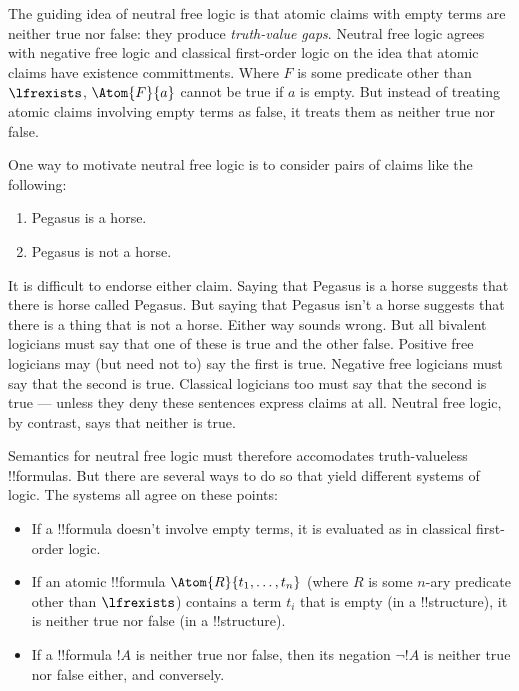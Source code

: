 \documentclass[../../../include/open-logic-section]{subfiles}
\begin{document}


The guiding idea of neutral free logic is that atomic claims with empty
terms are neither true nor false: they produce \emph{truth-value gaps}. 
Neutral free logic agrees with negative free logic and classical first-order
logic on the idea that atomic claims have existence committments. Where $F$ 
is some predicate other than $\lfrexists$, $\Atom{F}{a}$ cannot be 
true if $a$ is empty. But instead of treating atomic
claims involving empty terms as false, it treats them as neither true nor 
false. 

\begin{explain}
One way to motivate neutral free logic is to consider pairs of claims like
the following: 

\begin{enumerate}
  \item Pegasus is a horse.
  \item Pegasus is not a horse. 
\end{enumerate}

It is difficult to endorse either claim. Saying that Pegasus is a horse 
suggests that there is horse called Pegasus. But saying that Pegasus isn't
a horse suggests that there is a thing that is not a horse. Either way sounds
wrong. But all bivalent logicians must say that one of these is true and
the other false. Positive free logicians may (but need not to) say the first is true. 
Negative free logicians must say that the second is true. Classical logicians 
too must say that the second is true --- unless they deny these sentences express
claims at all. Neutral free logic, by contrast, says that neither is true.
\end{explain}

Semantics for neutral free logic must therefore accomodates truth-valueless
!!{formula}s. But there are several ways to do so that yield different 
systems of logic. The systems all agree on these points:

\begin{itemize}
	\item If a !!{formula} doesn't involve empty terms, it is evaluated
	as in classical first-order logic. 
	\item If an atomic !!{formula} $\Atom{R}{t_1,\ldots,t_n}$ (where $R$
	is some $n$-ary predicate other than $\lfrexists$) contains a
	term $t_i$ that is empty (in a !!{structure}), it is neither true nor 
	false (in a !!{structure}).
	\item If a !!{formula} $!A$ is neither true nor false, then its negation
	$\lnot !A$ is neither true nor false either, and conversely. 
\end{itemize}
\end{document}
